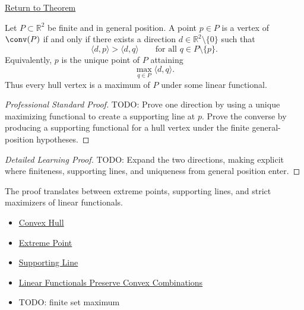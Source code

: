 \newpage
{}
\label{prf:computational-geometry-supporting-functional-hull-vertices}

\begin{remark*}[Return]
\hyperref[thm:computational-geometry-supporting-functional-hull-vertices]{Return to Theorem}

\end{remark*}

\begin{theorem*}
Let \(P\subset\mathbb{R}^2\) be finite and in general position. A point \(p\in P\)
is a vertex of \(\conv(P)\) if and only if there exists a direction
\(d\in\mathbb{R}^2\setminus\{0\}\) such that
\[
  \langle d,p\rangle>\langle d,q\rangle
  \qquad
  \text{for all } q\in P\setminus\{p\}.
\]
Equivalently, \(p\) is the unique point of \(P\) attaining
\[
  \max_{q\in P}\langle d,q\rangle.
\]
Thus every hull vertex is a maximum of \(P\) under some linear functional.
\end{theorem*}

\begin{proof}[Professional Standard Proof]
\LRAProofBodyStart
TODO: Prove one direction by using a unique maximizing functional to create a
supporting line at \(p\). Prove the converse by producing a supporting
functional for a hull vertex under the finite general-position hypotheses.
\end{proof}

\begin{proof}[Detailed Learning Proof]
\LRAProofBodyStart
TODO: Expand the two directions, making explicit where finiteness, supporting
lines, and uniqueness from general position enter.
\end{proof}

\begin{remark*}
The proof translates between extreme points, supporting lines, and strict
maximizers of linear functionals.
\end{remark*}

\begin{dependencies}
\begin{itemize}
  \item \hyperref[def:computational-geometry-convex-hull]{Convex Hull}
  \item \hyperref[def:computational-geometry-extreme-point]{Extreme Point}
  \item \hyperref[def:computational-geometry-supporting-line]{Supporting Line}
  \item \hyperref[lem:computational-geometry-linear-functionals-convex-combinations]{Linear Functionals Preserve Convex Combinations}
  \item TODO: finite set maximum
\end{itemize}
\end{dependencies}

\clearpage
